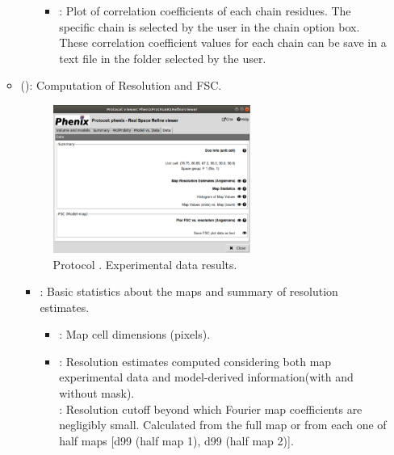 \begin{itemize}
\begin{itemize}
\begin{itemize}
\begin{itemize}
           \item {}: Plot of correlation coefficients of each chain residues. The specific chain is selected by the user in the chain option box. These correlation coefficient values for each chain can be save in a text file in the folder selected by the user.
         \end{itemize}
        \end{itemize}
      \item {} (): Computation of Resolution  and FSC.
       \begin{figure}[H]
         \centering 
         \captionsetup{width=.7\linewidth} 
         \includegraphics[width=0.65\textwidth]{Images_appendix/Fig152.pdf}
         \caption{Protocol . Experimental data results.}
         \label{fig:app_protocol_real_space_refine_5}
        \end{figure}
        \begin{itemize}
         \item {}: Basic statistics about the maps and summary of resolution estimates.
         \begin{itemize}
          \item {}: Map cell dimensions (pixels).
          \item {}: Resolution estimates computed considering both map experimental data and model-derived information(with and without mask)\setlength{\parindent}{12pt}.\\
            : Resolution cutoff beyond which Fourier map coefficients are negligibly small. Calculated from the full map or from each one of half maps [d99 (half map 1), d99 (half map 2)].\\

\end{itemize}
\end{itemize}
\end{itemize}
\end{itemize}
